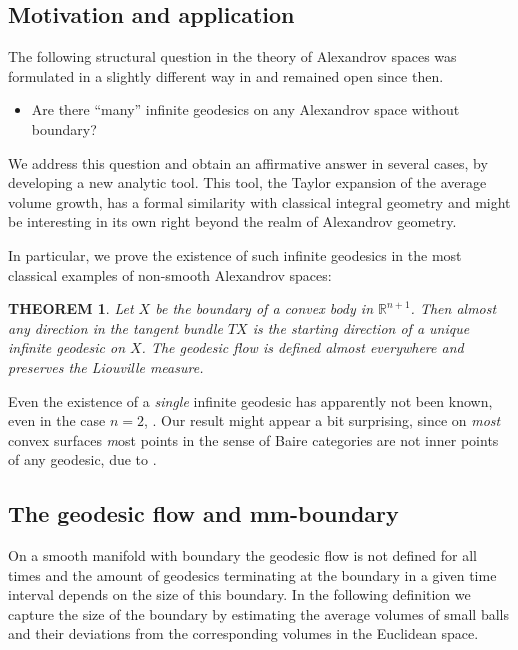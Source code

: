 \documentclass[12pt,leqno]{amsart}
\numberwithin{equation}{section}
\newtheorem{thm}{THEOREM}[section]
\theoremstyle{definition}
\theoremstyle{remark}
\begin{document}
\subsection{Motivation and application}
 The following structural question in    the theory of Alexandrov spaces was formulated in a slightly different way in \cite{PP} and remained open since then.
\begin{itemize}
\item Are there  ``many'' infinite geodesics on any Alexandrov space without boundary?
\end{itemize}
We address this question and obtain an affirmative answer in several cases, by
developing  a new analytic tool. This tool, the Taylor expansion of the average volume growth, has a formal similarity with  classical integral geometry
and might  be interesting in its own right beyond the realm of Alexandrov geometry.

In particular, we prove the existence of such  infinite geodesics in the most classical examples of non-smooth Alexandrov spaces:

\begin{thm} \label{thmfirst}
Let $X$ be the boundary of a convex body in $\mathbb R^{n+1}$.
Then almost any direction in the tangent bundle $TX$
is the starting direction of a unique  infinite geodesic on $X$.
The geodesic flow is defined  almost everywhere and  preserves the Liouville measure.
\end{thm}

 Even  the existence of a \emph{single} infinite geodesic has apparently  not been known,  even in the case $n=2$,   \cite{Zam-quest}. Our result might  appear a bit surprising,
since on \emph{most} convex surfaces {\emph most points in the sense of Baire categories}   are not inner points of any geodesic,  due to \cite{Zam-inv}.


 \subsection{The geodesic flow and mm-boundary}
On a smooth manifold with boundary the geodesic flow is not defined for all times and the amount of geodesics terminating at the boundary in a given time interval depends on the size  of this boundary.
In the following definition we capture the size of the boundary by estimating the average volumes of small balls and their deviations from the corresponding  volumes in the Euclidean space.
\end{document}

